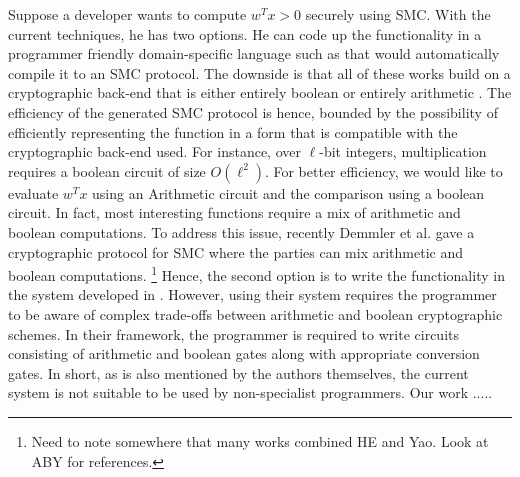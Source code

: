 Suppose a developer wants to compute $w^Tx >0$ securely using SMC. With the current techniques, he has two options.   He can code up the functionality in a programmer friendly domain-specific language such as \cite{lambdaps,wysteria,oblivm} that would automatically compile it to an SMC protocol. The downside is that all of these works build on a cryptographic back-end that is either entirely boolean \cite{yao,gmw} or entirely arithmetic \cite{homo}. The efficiency of the generated SMC protocol is hence, bounded by the possibility of efficiently representing the function in a form that is compatible with the cryptographic back-end used. For instance, over $\ell$-bit integers, multiplication requires a boolean circuit of size  $O(\ell^2)$. 
For better efficiency, we would like to evaluate $w^Tx$ using an Arithmetic circuit and the comparison using a boolean circuit.
In fact, most interesting functions require a mix of arithmetic and boolean computations.
To address this issue, recently Demmler et al. \cite{aby} gave a cryptographic protocol for SMC where the parties can mix arithmetic and boolean computations. \footnote{Need to note somewhere that many works combined HE and Yao. Look at ABY for references.}
Hence, the second option is to write the functionality in the system developed in \cite{aby}.
However, using their system requires the programmer to be aware of complex trade-offs between arithmetic and boolean cryptographic schemes. In their framework, the programmer is required to write circuits consisting of  arithmetic and boolean gates along with appropriate conversion gates. In short, as is also mentioned by the authors themselves, the current system is not suitable to be used by non-specialist programmers.  
Our work .....
 


